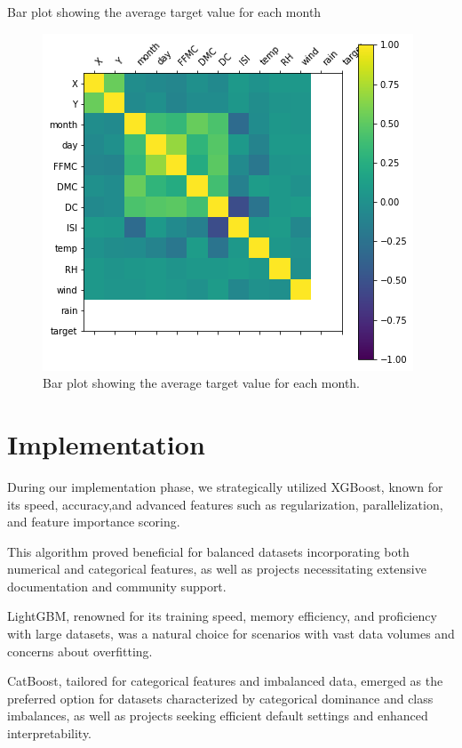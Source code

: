 \clearpage
Bar plot showing the average target value for each month
\begin{figure}[ht]
    \centering
    \includegraphics[scale=1.0]{figures/output_18_0.png}
    \caption{Bar plot showing the average target value for each month.}
    \label{fig:example-01}
\end{figure}

\clearpage
\section {Implementation}
During our implementation phase, we strategically utilized XGBoost, known for its speed, accuracy,and advanced features such as regularization, parallelization, and feature importance scoring. 

This algorithm proved beneficial for balanced datasets incorporating both numerical and categorical features, as well as projects necessitating extensive documentation and community support.

LightGBM, renowned for its training speed, memory efficiency, and proficiency with large datasets, was a natural choice for scenarios with vast data volumes and concerns about overfitting. 

CatBoost, tailored for categorical features and imbalanced data, emerged as the preferred option for datasets characterized by categorical dominance and class imbalances, as well as projects seeking
efficient default settings and enhanced interpretability.

